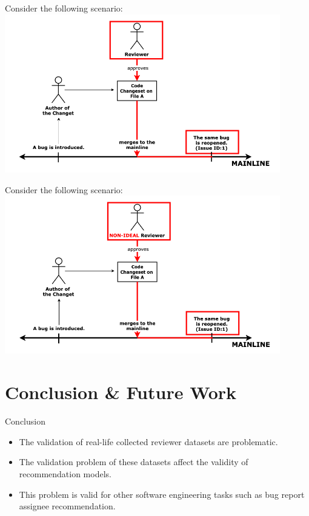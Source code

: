 \documentclass{beamer}
\begin{document}
    \begin{frame}{Consider the following scenario:}
    \centering\includegraphics[width=0.9\textwidth]{img/future_mining_3.png}\newline
    \caption{If the same bug is reopened later, it is a potential indicator that the pull request is not conducted properly and the reviewer is not ideal.}
    \end{frame}

    \begin{frame}{Consider the following scenario:}
    \centering\includegraphics[width=0.9\textwidth]{img/future_mining_4.png}\newline
    \caption{Removing these instances from the dataset will increase the validity of ground truth.}
    \end{frame}
    \fi

\section{Conclusion \& Future Work}
\begin{frame}{Conclusion}

\begin{itemize}
    
    \item\large The validation of real-life collected reviewer datasets are problematic.
    \pause
   \item\large The validation problem of these datasets affect the validity of recommendation models.    
    \pause
    \item\large This problem is valid for other software engineering tasks such as bug report assignee recommendation.
\end{itemize}
\end{frame}
\end{document}
